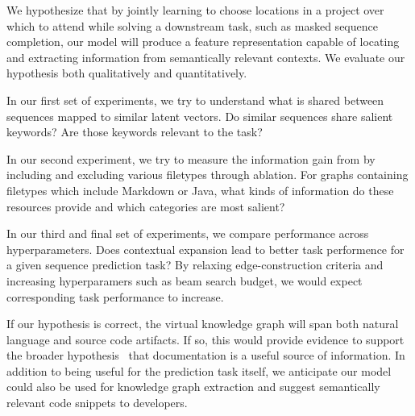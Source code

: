 \documentclass[11pt]{article}
\begin{document}
We hypothesize that by jointly learning to choose locations in a project over which to attend while solving a downstream task, such as masked sequence completion, our model will produce a feature representation capable of locating and extracting information from semantically relevant contexts. We evaluate our hypothesis both qualitatively and quantitatively.

In our first set of experiments, we try to understand what is shared between sequences mapped to similar latent vectors. Do similar sequences share salient keywords? Are those keywords relevant to the task?

In our second experiment, we try to measure the information gain from by including and excluding various filetypes through ablation. For graphs containing filetypes which include Markdown or Java, what kinds of information do these resources provide and which categories are most salient?


In our third and final set of experiments, we compare performance across hyperparameters. Does contextual expansion lead to better task performence for a given sequence prediction task? By relaxing edge-construction criteria and increasing hyperparamers such as beam search budget, we would expect corresponding task performance to increase.

If our hypothesis is correct, the virtual knowledge graph will span both natural language and source code artifacts. If so, this would provide evidence to support the broader hypothesis~\cite{guo2017semantically} that documentation is a useful source of information. In addition to being useful for the prediction task itself, we anticipate our model could also be used for knowledge graph extraction and suggest semantically relevant code snippets to developers.


%
%
\end{document}

